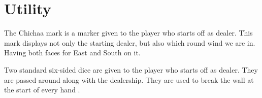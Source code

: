 \section{Utility}\label{core:sec:utility}

	{}
	{The Chichaa mark is a marker given to the player who starts off as dealer. This mark displays not only the starting dealer, but also which round wind we are in. Having both faces for East and South on it.
	}

	{}
	{Two standard six-sided dice are given to the player who starts off as dealer. They are passed around along with the dealership. They are used to break the wall at the start of every hand .}
